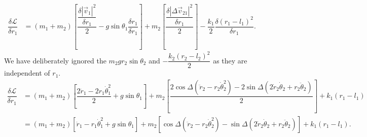\documentclass[12pt,a4paper,portrait]{article}
\newcommand{\lag}{\mathcal{L}}
\begin{document}
\begin{landscape}
\begin{align*}
	\dfrac{\delta \lag}{\delta r_1} &= (m_1+m_2)\left[\dfrac{\dfrac{\delta |\vec{v}_1|^2}{\delta r_1}}{2} -g\sin{\theta_1}\dfrac{\delta r_1}{\delta r_1}\right] + m_2\left[\dfrac{\dfrac{\delta |\Delta \vec{v}_{21}|^2}{\delta r_1}}{2}\right] - \dfrac{k_1}{2} \dfrac{\delta (r_1-l_1)^2}{\delta r_1}.
\end{align*}
We have deliberately ignored the $m_2gr_2\sin{\theta_2}$ and $-\dfrac{k_2(r_2-l_2)^2}{2}$ as they are independent of $r_1$.
\begin{align*}
	\dfrac{\delta \lag}{\delta r_1} &= (m_1+m_2)\left[\dfrac{2\ddot{r}_1-2r_1\dot{\theta}_1^2}{2} + g\sin{\theta_1}\right] + m_2\left[\dfrac{2\cos{\Delta}(\ddot{r}_2-r_2\dot{\theta}_2^2) - 2\sin{\Delta} (2\dot{r}_2\dot{\theta}_2+r_2\ddot{\theta}_2)}{2}\right] + k_1(r_1-l_1)\\
	&= (m_1+m_2)\left[\ddot{r}_1-r_1\dot{\theta}_1^2 + g\sin{\theta_1}\right] + m_2\left[\cos{\Delta}(\ddot{r}_2-r_2\dot{\theta}_2^2) - \sin{\Delta} (2\dot{r}_2\dot{\theta}_2+r_2\ddot{\theta}_2)\right] + k_1(r_1-l_1).
\end{align*}
	

\end{landscape}
\end{document}
